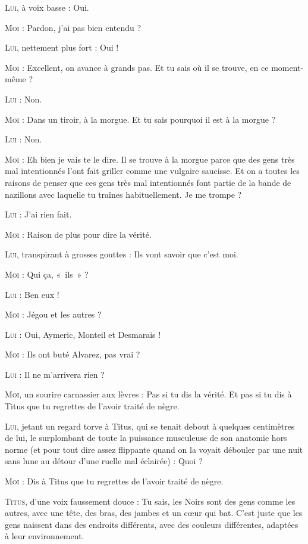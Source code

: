 \begin{dialogue}

\textsc{Lui}, à voix basse : Oui.

\textsc{Moi} : Pardon, j’ai pas bien entendu ?

\textsc{Lui}, nettement plus fort : Oui !

\textsc{Moi} : Excellent, on avance à grands pas. Et tu sais où il se trouve, en ce moment-même ?

\textsc{Lui} : Non.

\textsc{Moi} : Dans un tiroir, à la morgue. Et tu sais pourquoi il est à la morgue ?

\textsc{Lui} : Non.

\textsc{Moi} : Eh bien je vais te le dire. Il se trouve à la morgue parce que des gens très mal intentionnés l’ont fait griller comme une vulgaire saucisse. Et on a toutes les raisons de penser que ces gens très mal intentionnés font partie de la bande de nazillons avec laquelle tu traînes habituellement. Je me trompe ?

\textsc{Lui} : J’ai rien fait.

\textsc{Moi} : Raison de plus pour dire la vérité.

\textsc{Lui}, transpirant à grosses gouttes : Ils vont savoir que c’est moi.

\textsc{Moi} : Qui ça, «~ils~» ?

\textsc{Lui} : Ben eux !

\textsc{Moi} : Jégou et les autres ?

\textsc{Lui} : Oui, Aymeric, Monteil et Desmarais !

\textsc{Moi} : Ils ont buté Alvarez, pas vrai ?

\textsc{Lui} : Il ne m’arrivera rien ?

\textsc{Moi}, un sourire carnassier aux lèvres : Pas si tu dis la vérité. Et pas si tu dis à Titus que tu regrettes de l’avoir traité de nègre.

\textsc{Lui}, jetant un regard torve à Titus, qui se tenait debout à quelques centimètres de lui, le surplombant de toute la puissance musculeuse de son anatomie hors norme (et pour tout dire assez flippante quand on la voyait débouler par une nuit sans lune au détour d’une ruelle mal éclairée) : Quoi ?

\textsc{Moi} : Dis à Titus que tu regrettes de l’avoir traité de nègre.

\textsc{Titus}, d’une voix faussement douce : Tu sais, les Noirs sont des gens comme les autres, avec une tête, des bras, des jambes et un cœur qui bat. C’est juste que les gens naissent dans des endroits différents, avec des couleurs différentes, adaptées à leur environnement.


\end{dialogue}
